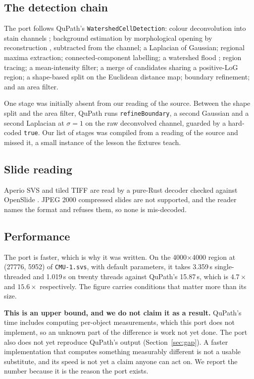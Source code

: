 \documentclass[11pt,a4paper]{article}
\begin{document}
\subsection{The detection chain}

The port follows QuPath's \texttt{WatershedCellDetection}: colour deconvolution
into stain channels \cite{ruifrok2001quantification}; background estimation by
morphological opening by reconstruction \cite{vincent1993morphological},
subtracted from the channel; a Laplacian of Gaussian; regional maxima
extraction; connected-component labelling; a watershed flood
\cite{vincent1991watersheds}; region tracing; a mean-intensity filter; a merge
of candidates sharing a positive-LoG region; a shape-based split on the
Euclidean distance map; boundary refinement; and an area filter.

One stage was initially absent from our reading of the source. Between the
shape split and the area filter, QuPath runs \texttt{refineBoundary}, a second
Gaussian and a second Laplacian at $\sigma = 1$ on the raw deconvolved channel,
guarded by a hard-coded \texttt{true}. Our list of stages was compiled from a
reading of the source and missed it, a small instance of the lesson the
fixtures teach.

\subsection{Slide reading}

Aperio SVS and tiled TIFF are read by a pure-Rust decoder checked against
OpenSlide \cite{goode2013openslide}. JPEG 2000 compressed slides are not
supported, and the reader names the format and refuses them, so none is
mis-decoded.

\subsection{Performance}
\label{sec:perf}

The port is faster, which is why it was written. On the 4000$\times$4000 region
at (27776, 5952) of \texttt{CMU-1.svs}, with default parameters, it takes
3.359\,s single-threaded and 1.019\,s on twenty threads against QuPath's
15.87\,s, which is $4.7\times$ and $15.6\times$ respectively. The figure
carries conditions that matter more than its size.

\textbf{This is an upper bound, and we do not claim it as a result.} QuPath's
time includes computing per-object measurements, which this port does not
implement, so an unknown part of the difference is work not yet done. The port
also does not yet reproduce QuPath's output (Section~\ref{sec:gap}). A faster
implementation that computes something measurably different is not a usable
substitute, and its speed is not yet a claim anyone can act on. We report the
number because it is the reason the port exists.
\end{document}
